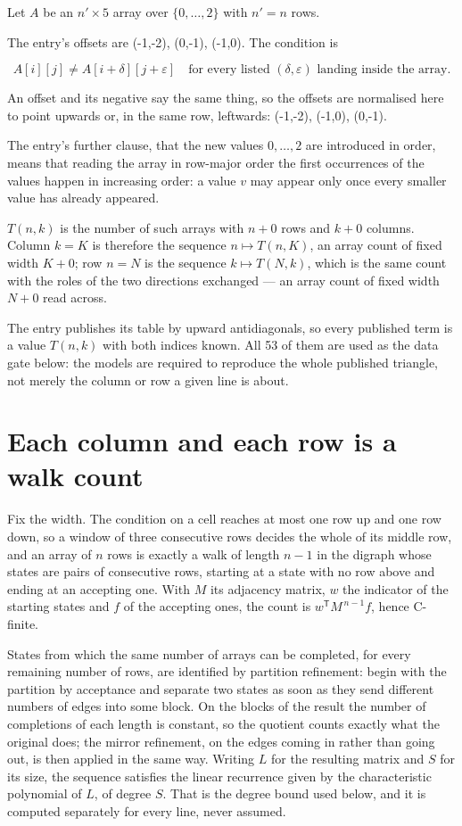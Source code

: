 \documentclass[11pt]{article}
\theoremstyle{definition}
\begin{document}
Let $A$ be an $n' \times 5$ array over $\{0,\dots,2\}$ with $n' = n$ rows.

The entry's offsets are (-1,-2), (0,-1), (-1,0). The condition is

\[A[i][j] \ne A[i{+}\delta][j{+}\varepsilon]\quad\text{for every listed }(\delta,\varepsilon)\text{ landing inside the array.}\]

An offset and its negative say the same thing, so the offsets are normalised here to point upwards or, in the same row, leftwards: (-1,-2), (-1,0), (0,-1).

The entry's further clause, that the new values $0,\dots,2$ are introduced in order, means that reading the array in row-major order the first occurrences of the values happen in increasing order: a value $v$ may appear only once every smaller value has already appeared.

$T(n,k)$ is the number of such arrays with $n + 0$ rows and $k + 0$ columns. Column $k = K$ is therefore the sequence $n \mapsto T(n,K)$, an array count of fixed width $K + 0$; row $n = N$ is the sequence $k \mapsto T(N,k)$, which is the same count with the roles of the two directions exchanged --- an array count of fixed width $N + 0$ read across.

The entry publishes its table by upward antidiagonals, so every published term is a value $T(n,k)$ with both indices known. All 53 of them are used as the data gate below: the models are required to reproduce the whole published triangle, not merely the column or row a given line is about.

\section{Each column and each row is a walk count}

Fix the width. The condition on a cell reaches at most one row up and one row down, so a window of three consecutive rows decides the whole of its middle row, and an array of $n$ rows is exactly a walk of length $n-1$ in the digraph whose states are pairs of consecutive rows, starting at a state with no row above and ending at an accepting one. With $M$ its adjacency matrix, $w$ the indicator of the starting states and $f$ of the accepting ones, the count is $w^{\mathsf T}M^{\,n-1}f$, hence C-finite.

States from which the same number of arrays can be completed, for every remaining number of rows, are identified by partition refinement: begin with the partition by acceptance and separate two states as soon as they send different numbers of edges into some block. On the blocks of the result the number of completions of each length is constant, so the quotient counts exactly what the original does; the mirror refinement, on the edges coming in rather than going out, is then applied in the same way. Writing $L$ for the resulting matrix and $S$ for its size, the sequence satisfies the linear recurrence given by the characteristic polynomial of $L$, of degree $S$. That is the degree bound used below, and it is computed separately for every line, never assumed.
\end{document}
